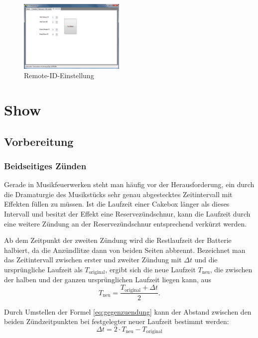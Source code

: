 \documentclass[pdftex, parskip, numbers=noenddot, toc=listof]{scrbook}
\begin{document}
			\begin{figure}[!t]
				\centering
				\includegraphics[width=0.45\textwidth]{bilder/gui-remote}
				\caption{Remote-ID-Einstellung}
				\label{fig:gui-remote}
			\end{figure}

	\chapter{Show}

		\section{Vorbereitung}

			\subsection{Beidseitiges Zünden}
				Gerade in Musikfeuerwerken steht man häufig vor der Herausforderung, ein durch die Dramaturgie des Musikstücks sehr genau abgestecktes Zeitintervall mit Effekten füllen zu müssen. Ist die Laufzeit einer Cakebox länger als dieses Intervall und besitzt der Effekt eine Reservezündschnur, kann die Laufzeit durch eine weitere Zündung an der Reservezündschnur entsprechend verkürzt werden.
				
				Ab dem Zeitpunkt der zweiten Zündung wird die Restlaufzeit der Batterie halbiert, da die Anzündlitze dann von beiden Seiten abbrennt. Bezeichnet man das Zeitintervall zwischen erster und zweiter Zündung mit ${\Delta}t$ und die ursprüngliche Laufzeit als $T_\text{original}$, ergibt sich die neue Laufzeit $T_\text{neu}$, die zwischen der halben und der ganzen ursprünglichen Laufzeit liegen kann, aus
				\begin{equation}
					T_\text{neu} = \frac{T_\text{original} + {\Delta}t}{2}.
					\label{eq:gegenzuendung}
				\end{equation}

				Durch Umstellen der Formel \eqref{eq:gegenzuendung} kann der Abstand zwischen den beiden Zündzeitpunkten bei festgelegter neuer Laufzeit bestimmt werden:
				\begin{equation}
					{\Delta}t = 2 {\cdot} T_\text{neu} - T_\text{original}
				\end{equation}
				
\end{document}
